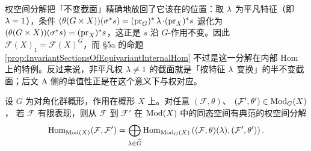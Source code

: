 \begin{yizhu}[权 $0$ 部分就是不变截面]
权空间分解把「不变截面」精确地放回了它该在的位置：取 $\operatorname{\lambda}$ 为平凡特征（即 $\operatorname{\lambda}=1$），条件 $(\theta(G\times X))(\sigma^* s)=(\operatorname{\operatorname{pr}}_G)^*\operatorname{\lambda}\cdot(\operatorname{\operatorname{pr}}_X)^*s$ 退化为 $(\theta(G\times X))(\sigma^* s)=(\operatorname{\operatorname{pr}}_X)^*s$，这正是 $s$ 沿 $G$-作用不变。因此 $\mathcal{F}(X)_{1}=\mathcal{F}(X)^{G}$，而 §5a 的命题 \ref{prop:InvariantSectionsOfEquivariantInternalHom} 不过是这一分解在内部 Hom 上的特例。反过来说，非平凡权 $\operatorname{\lambda}\neq1$ 的截面就是「按特征 $\operatorname{\lambda}$ 变换」的半不变截面；后文 A 侧的单值性正是在这个意义下与权对应。
\end{yizhu}

\begin{prop}[同态空间的权空间分解]
\label{prop:WeightSpaceDecompositionOfHomSpace}
设 $G$ 为对角化群概形，作用在概形 $X$ 上。对任意
$(\mathcal{F}, \theta)$、
$(\mathcal{F}', \theta') \in \operatorname{\mathrm{Mod}}_G(X)$，
若
$\mathcal{F}$
有限表现，则从 $\mathcal{F}$ 到 $\mathcal{F}'$ 在 $\operatorname{\mathrm{Mod}}(X)$ 中的同态空间有典范的权空间分解
$$
\operatorname{Hom}_{\operatorname{\mathrm{Mod}}(X)}(\mathcal{F}, \mathcal{F}') 
= 
\bigoplus_{\operatorname{\lambda} \in \widehat{G}} \operatorname{Hom}_{\operatorname{\mathrm{Mod}}_G(X)}\left( (\mathcal{F}, \theta)(\operatorname{\lambda}), (\mathcal{F}', \theta') \right).
$$
\end{prop}

